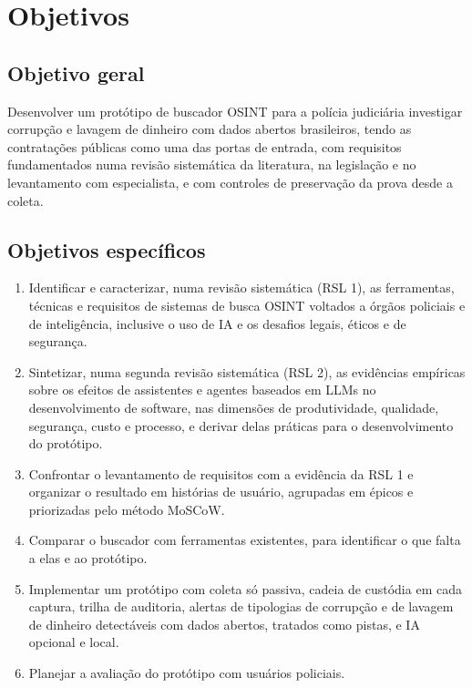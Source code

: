 \section{Objetivos}
\label{sec:intro-objetivos}

\subsection{Objetivo geral}

Desenvolver um protótipo de buscador OSINT para a polícia judiciária
investigar corrupção e lavagem de dinheiro com dados abertos brasileiros,
tendo as contratações públicas como uma das portas de entrada, com
requisitos fundamentados numa revisão sistemática da literatura, na
legislação e no levantamento com especialista, e com controles de
preservação da prova desde a coleta.

\subsection{Objetivos específicos}

\begin{enumerate}
	\item Identificar e caracterizar, numa revisão sistemática (RSL 1), as
	ferramentas, técnicas e requisitos de sistemas de busca OSINT voltados a
	órgãos policiais e de inteligência, inclusive o uso de IA e os desafios
	legais, éticos e de segurança.
	\item Sintetizar, numa segunda revisão sistemática (RSL 2), as evidências
	empíricas sobre os efeitos de assistentes e agentes baseados em LLMs no
	desenvolvimento de software, nas dimensões de produtividade, qualidade,
	segurança, custo e processo, e derivar delas práticas para o
	desenvolvimento do protótipo.
	\item Confrontar o levantamento de requisitos com a evidência da RSL 1 e
	organizar o resultado em histórias de usuário, agrupadas em épicos e
	priorizadas pelo método MoSCoW.
	\item Comparar o buscador com ferramentas existentes, para identificar o
	que falta a elas e ao protótipo.
	\item Implementar um protótipo com coleta só passiva, cadeia de custódia em
	cada captura, trilha de auditoria, alertas de tipologias de corrupção e
	de lavagem de dinheiro detectáveis com dados abertos, tratados como
	pistas, e IA opcional e local.
	\item Planejar a avaliação do protótipo com usuários policiais.
\end{enumerate}

